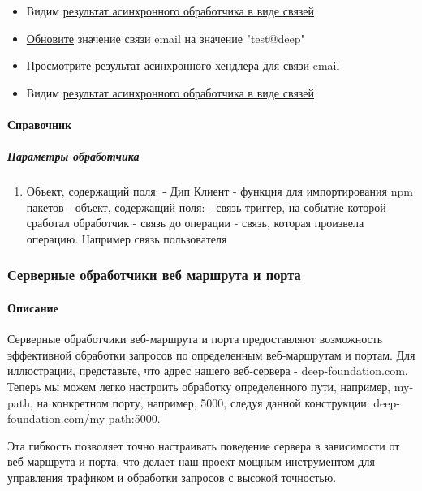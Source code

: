 \documentclass{article}
\begin{document}
\begin{itemize}
      \item Видим \hyperlink{Handlers.Async.Result}{результат асинхронного
                  обработчика в виде связей}
      \item \hyperlink{DeepCase.UpdateLink.Description}{Обновите} значение
            связи email на значение "test@deep"
      \item \hyperlink{Handlers.Async.HowToGetResult}{Просмотрите результат
                  асинхронного хендлера для связи email}
      \item Видим \hyperlink{Handlers.Async.Result}{результат асинхронного
                  обработчика в виде связей}
\end{itemize}

\paragraph{Справочник}
\subparagraph{Параметры обработчика}
\begin{enumerate}
      \item Объект, содержащий поля:
             - Дип Клиент
             - функция для импортирования npm пакетов
             - объект, содержащий поля:
             - связь-триггер, на событие которой сработал
            обработчик
             - связь до операции
             - связь, которая произвела операцию.
            Например связь пользователя
\end{enumerate}
\subsubsection{Серверные обработчики веб маршрута и порта}
\paragraph{Описание}
Серверные обработчики веб-маршрута и порта предоставляют возможность
эффективной обработки запросов по определенным веб-маршрутам и портам. Для
иллюстрации, представьте, что адрес нашего веб-сервера - deep-foundation.com.
Теперь мы можем легко настроить обработку определенного пути, например,
my-path, на конкретном порту, например, 5000, следуя данной конструкции:
deep-foundation.com/my-path:5000.

Эта гибкость позволяет точно настраивать поведение сервера в зависимости от
веб-маршрута и порта, что делает наш проект мощным инструментом для управления
трафиком и обработки запросов с высокой точностью.
\end{document}
